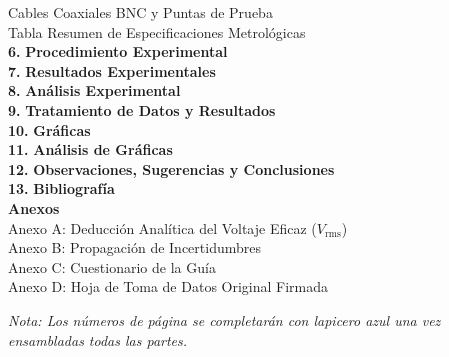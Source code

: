 \documentclass[a4paper, 11pt]{article}
\begin{document}
\begin{tcolorbox}[title=Texto a Escribir en el Índice (Trazar líneas punteadas con regla), colframe=black]
\begin{tabbing}
         Cables Coaxiales BNC y Puntas de Prueba \dotfill \> [ \quad ] \\
         Tabla Resumen de Especificaciones Metrológicas \dotfill \> [ \quad ] \\
        \textbf{6.} \> \textbf{Procedimiento Experimental} \dotfill \> [ \quad ] \\
        \textbf{7.} \> \textbf{Resultados Experimentales} \dotfill \> [ \quad ] \\
        \textbf{8.} \> \textbf{Análisis Experimental} \dotfill \> [ \quad ] \\
        \textbf{9.} \> \textbf{Tratamiento de Datos y Resultados} \dotfill \> [ \quad ] \\
        \textbf{10.} \> \textbf{Gráficas} \dotfill \> [ \quad ] \\
        \textbf{11.} \> \textbf{Análisis de Gráficas} \dotfill \> [ \quad ] \\
        \textbf{12.} \> \textbf{Observaciones, Sugerencias y Conclusiones} \dotfill \> [ \quad ] \\
        \textbf{13.} \> \textbf{Bibliografía} \dotfill \> [ \quad ] \\
        \textbf{Anexos} \dotfill \> [ \quad ] \\
        \> Anexo A: Deducción Analítica del Voltaje Eficaz ($V_{\text{rms}}$) \dotfill \> [ \quad ] \\
        \> Anexo B: Propagación de Incertidumbres \dotfill \> [ \quad ] \\
        \> Anexo C: Cuestionario de la Guía \dotfill \> [ \quad ] \\
        \> Anexo D: Hoja de Toma de Datos Original Firmada \dotfill \> [ \quad ]
    \end{tabbing}
    \textit{\footnotesize Nota: Los números de página se completarán con lapicero azul una vez ensambladas todas las partes.}
\end{tcolorbox}

\newpage

\end{document}
